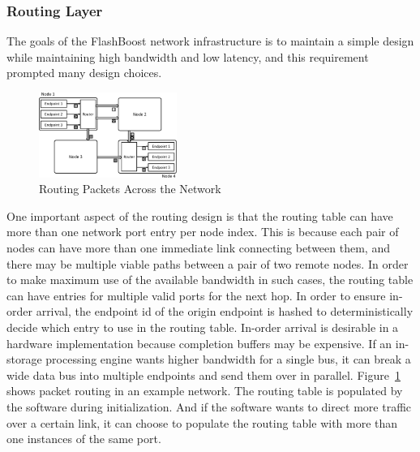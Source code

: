 \subsubsection{Routing Layer}

The goals of the FlashBoost network infrastructure is to maintain a simple
design while maintaining high bandwidth and low latency, and this requirement
prompted many design choices.

\begin{figure}[h]
	\begin{center}
	\includegraphics[width=0.4\textwidth]{figures/routing-crop.pdf}
	\caption{Routing Packets Across the Network}
	\label{fig:networkrouting}
	\end{center}
\end{figure}



One important aspect of the routing design is that the routing table can have
more than one network port entry per node index. This is because each pair of
nodes can have more than one immediate link connecting between them, and there may be
multiple viable paths between a pair of two remote nodes. In order to make
maximum use of the available bandwidth in such cases, the routing table can have
entries for multiple valid ports for the next hop. In order to ensure in-order
arrival, the endpoint id of the origin endpoint is hashed to deterministically
decide which entry to use in the routing table. In-order arrival is desirable in
a hardware implementation because completion buffers may be expensive. If an
in-storage processing engine wants higher bandwidth for a single bus, it can
break a wide data bus into multiple endpoints and send them over in parallel.
Figure~\ref{fig:networkrouting} shows packet routing in an example network.
The routing table is populated by the software during initialization. And if the
software wants to direct more traffic over a certain link, it can choose to
populate the routing table with more than one instances of the same port.


